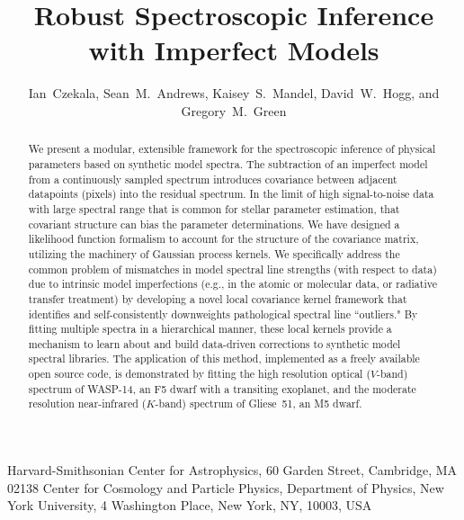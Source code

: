 \documentclass[iop,floatfix,numberedappendix,twocolappendix]{emulateapj}
\begin{document}
\graphicspath{{figs/}}

\title{Robust Spectroscopic Inference with Imperfect Models}

\newcommand{\harvard}{1}
\newcommand{\nyu}{2}
\newcommand{\mpia}{3}
\newcommand{\cds}{4}

\author{%
  Ian~Czekala\altaffilmark{\harvard }, 
  Sean~M.~Andrews\altaffilmark{\harvard },
  Kaisey~S.~Mandel\altaffilmark{\harvard },
  David~W.~Hogg\altaffilmark{\nyu },
  and Gregory~M.~Green\altaffilmark{\harvard}
}

\altaffiltext{\harvard}  {Harvard-Smithsonian Center for Astrophysics, 
			 60 Garden Street, Cambridge, MA 02138}
\altaffiltext{\nyu}      {Center for Cosmology and Particle Physics,
                          Department of Physics, New York University,
                          4 Washington Place, New York, NY, 10003, USA}


\begin{abstract}
We present a modular, extensible framework for the spectroscopic inference of 
physical parameters based on synthetic model spectra.  The subtraction of an 
imperfect model from a continuously sampled spectrum introduces covariance 
between adjacent datapoints (pixels) into the residual spectrum.  In the limit 
of high signal-to-noise data with large spectral range that is common for 
stellar parameter estimation, that covariant structure can bias the parameter 
determinations.  We have designed a likelihood function formalism to account 
for the structure of the covariance matrix, utilizing the machinery of Gaussian 
process kernels.  We specifically address the common problem of mismatches in 
model spectral line strengths (with respect to data) due to intrinsic model 
imperfections (e.g., in the atomic or molecular data, or radiative transfer 
treatment) by developing a novel local covariance kernel framework that 
identifies and self-consistently downweights pathological spectral line 
``outliers."  By fitting multiple spectra in a hierarchical manner, these local 
kernels provide a mechanism to learn about and build data-driven corrections to 
synthetic model spectral libraries.  The application of this method, 
implemented as a freely available open source code, is demonstrated by fitting 
the high resolution optical ($V$-band) spectrum of WASP-14, an F5 dwarf with a 
transiting exoplanet, and the moderate resolution near-infrared ($K$-band) 
spectrum of Gliese~51, an M5 dwarf. 
\end{abstract}
\end{document}
